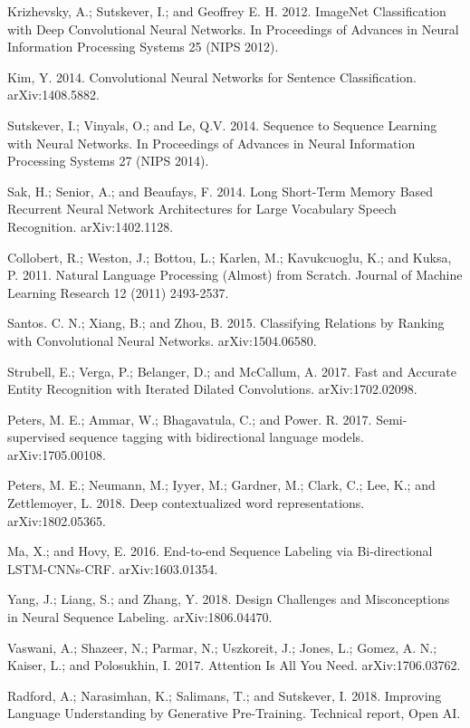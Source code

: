 \documentclass[letterpaper]{article} %
\begin{document}
\smallskip \noindent
Krizhevsky, A.; Sutskever, I.; and Geoffrey E. H. 2012. ImageNet Classification with Deep Convolutional Neural Networks. In Proceedings of  Advances in Neural Information Processing Systems 25 (NIPS 2012).

\smallskip \noindent
Kim, Y. 2014. Convolutional Neural Networks for Sentence Classification. arXiv:1408.5882.

\smallskip \noindent
Sutskever, I.; Vinyals, O.; and Le, Q.V. 2014. Sequence to Sequence Learning with Neural Networks. In Proceedings of Advances in Neural Information Processing Systems 27 (NIPS 2014).

\smallskip \noindent
Sak, H.; Senior, A.; and Beaufays, F. 2014. Long Short-Term Memory Based Recurrent Neural Network Architectures for Large Vocabulary Speech Recognition. arXiv:1402.1128.

\smallskip \noindent 
Collobert, R.; Weston, J.; Bottou, L.; Karlen, M.; Kavukcuoglu, K.; and Kuksa, P. 2011. Natural Language Processing (Almost) from Scratch. Journal of Machine Learning Research 12 (2011) 2493-2537. 

\smallskip \noindent
Santos. C. N.; Xiang, B.; and Zhou, B. 2015. Classifying Relations by Ranking with Convolutional Neural Networks. arXiv:1504.06580. 

\smallskip \noindent
Strubell, E.; Verga, P.; Belanger, D.; and McCallum, A. 2017. Fast and Accurate Entity Recognition with Iterated Dilated Convolutions. arXiv:1702.02098. 

\smallskip \noindent
Peters, M. E.; Ammar, W.; Bhagavatula, C.; and Power. R.  2017. Semi-supervised sequence tagging with bidirectional language models. arXiv:1705.00108.

\smallskip \noindent 
Peters, M. E.; Neumann, M.; Iyyer, M.; Gardner, M.; Clark, C.; Lee, K.; and Zettlemoyer, L. 2018. Deep contextualized word representations. arXiv:1802.05365. 

\smallskip \noindent
Ma, X.; and Hovy, E. 2016. End-to-end Sequence Labeling via Bi-directional LSTM-CNNs-CRF. arXiv:1603.01354. 

\smallskip \noindent
Yang, J.; Liang, S.; and Zhang, Y. 2018. Design Challenges and Misconceptions in Neural Sequence Labeling. arXiv:1806.04470. 

\smallskip \noindent
Vaswani, A.; Shazeer, N.; Parmar, N.; Uszkoreit, J.; Jones, L.; Gomez, A. N.; Kaiser, L.; and Polosukhin, I. 2017. Attention Is All You Need. arXiv:1706.03762. 

\smallskip \noindent
Radford, A.; Narasimhan, K.; Salimans, T.; and Sutskever, I. 2018. Improving Language Understanding by Generative Pre-Training. Technical report, Open AI.
\end{document}

